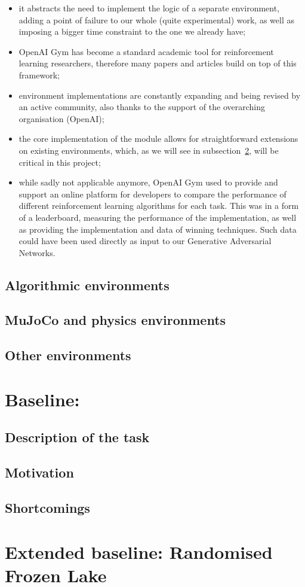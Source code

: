 \begin{itemize}
	\item it abstracts the need to implement the logic of a separate environment, adding a point of failure to our whole (quite experimental) work, as well as imposing a bigger time constraint to the one we already have;
	\item OpenAI Gym has become a standard academic tool for reinforcement learning researchers, therefore many papers and articles build on top of this framework;
	\item environment implementations are constantly expanding and being revised by an active community, also thanks to the support of the overarching organisation (OpenAI);
	\item the core implementation of the  module allows for straightforward extensions on existing environments, which, as we will see in subsection~\ref{ExtendedBaseline}, will be critical in this project;
	\item while sadly not applicable anymore, OpenAI Gym used to provide and support an online platform for developers to compare the performance of different reinforcement learning algorithms for each task. This was in a form of a leaderboard, measuring the performance of the implementation, as well as providing the implementation and data of winning techniques. Such data could have been used directly as input to our Generative Adversarial Networks.
\end{itemize}

\subsection{Algorithmic environments}
\subsection{MuJoCo and physics environments}
\subsection{Other environments}


\section{Baseline: }
\subsection{Description of the task}
\subsection{Motivation}
\subsection{Shortcomings}

\section{Extended baseline: Randomised Frozen Lake}
\label{ExtendedBaseline}